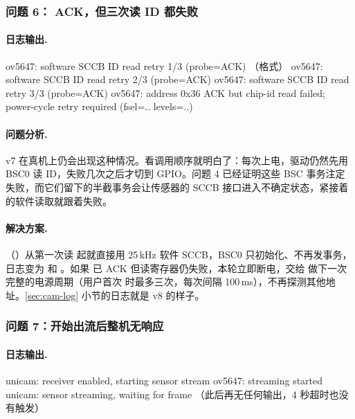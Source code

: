 \subsubsection{问题 6： ACK，但三次读 ID 都失败}

\paragraph{日志输出.}
\begin{txtcode}
ov5647: software SCCB ID read retry 1/3 (probe=ACK)            （格式）
ov5647: software SCCB ID read retry 2/3 (probe=ACK)
ov5647: software SCCB ID read retry 3/3 (probe=ACK)
ov5647: address 0x36 ACK but chip-id read failed; power-cycle retry required (fsel=.. levels=..)
\end{txtcode}

\paragraph{问题分析.} v7 在真机上仍会出现这种情况。看调用顺序就明白了：每次上电，驱动仍然先用 BSC0 读 ID，失败几次之后才切到 GPIO。问题 4 已经证明这些 BSC 事务注定失败，而它们留下的半截事务会让传感器的 SCCB 接口进入不确定状态，紧接着的软件读取就跟着失败。

\paragraph{解决方案.}（）从第一次读  起就直接用 25\,kHz 软件 SCCB，BSC0 只初始化、不再发事务，日志变为  和 。如果  已 ACK 但读寄存器仍失败，本轮立即断电，交给  做下一次完整的电源周期（用户首次  时最多三次，每次间隔 100\,ms），不再探测其他地址。\ref{sec:cam-log} 小节的日志就是 v8 的样子。

\subsubsection{问题 7：开始出流后整机无响应}

\paragraph{日志输出.}
\begin{txtcode}
unicam: receiver enabled, starting sensor stream
ov5647: streaming started
unicam: sensor streaming, waiting for frame
（此后再无任何输出，4 秒超时也没有触发）
\end{txtcode}

